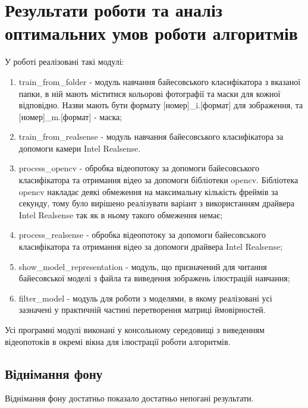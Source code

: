 \section{Результати роботи та аналіз оптимальних умов роботи алгоритмів}
У роботі реалізовані такі модулі:
\begin{enumerate}
	\item train\_from\_folder - модуль навчання байесовського класифікатора з вказаної папки, в ній мають міститися кольорові фотографії та маски для кожної відповідно. Назви мають бути формату [номер]\_i.[формат] для зображення, та [номер]\_m.[формат] - маска;
	\item train\_from\_realsense - модуль навчання байесовського класифікатора за допомоги камери Intel Realsense.
	\item process\_opencv - обробка відеопотоку за допомоги байесовського класифікатора та отримання відео за допомоги бібліотеки opencv. Бібліотека opencv накладає деякі обмеження на максимальну кількість фреймів за секунду, тому було вирішено реалізувати варіант з використанням драйвера Intel Realsense так як в ньому такого обмеження немає;
	\item process\_realsense - обробка відеопотоку за допомоги байесовського класифікатора та отримання відео за допомоги драйвера Intel Realsense;
	\item show\_model\_representation - модуль, що призначений для читання байесовської моделі з файла та виведення зображень ілюстрацій навчання;
	\item filter\_model - модуль для роботи з моделями, в якому реалізовані усі зазначені у практичній частині перетворення матриці ймовірностей.
\end{enumerate}

Усі програмні модулі виконані у консольному середовищі з виведенням відеопотоків в окремі вікна для ілюстрації роботи алгоритмів.
\subsection{Віднімання фону}
Віднімання фону достатньо показало достатньо непогані результати.

